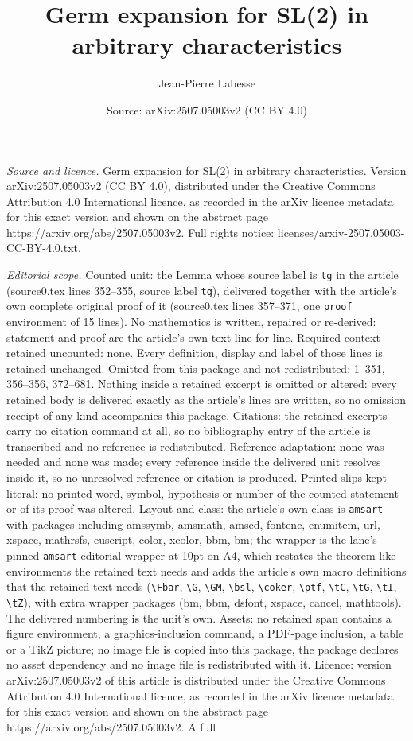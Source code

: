 \documentclass[10pt,a4paper]{amsart}
\title[Germ expansion for SL(2) in arbitrary characteristics]{Germ expansion for SL(2) in arbitrary characteristics}
\author{Jean-Pierre Labesse}
\date{Source: arXiv:2507.05003v2 (CC BY 4.0)}
\begin{document}
\maketitle

\noindent\emph{Source and licence.} Germ expansion for SL(2) in arbitrary characteristics. Version arXiv:2507.05003v2 (CC BY 4.0), distributed under the Creative Commons Attribution 4.0 International licence, as recorded in the arXiv licence metadata for this exact version and shown on the abstract page https://arxiv.org/abs/2507.05003v2. Full rights notice: licenses/arxiv-2507.05003-CC-BY-4.0.txt.\par\smallskip

\noindent\textit{Editorial scope.} Counted unit: the Lemma whose source label is \texttt{tg} in the article (source0.tex lines 352--355, source label \texttt{tg}), delivered together with the article's own complete original proof of it (source0.tex lines 357--371, one \texttt{proof} environment of 15 lines). No mathematics is written, repaired or re-derived: statement and proof are the article's own text line for line. Required context retained uncounted: none. Every definition, display and label of those lines is retained unchanged. Omitted from this package and not redistributed: 1--351, 356--356, 372--681. Nothing inside a retained excerpt is omitted or altered: every retained body is delivered exactly as the article's lines are written, so no omission receipt of any kind accompanies this package. Citations: the retained excerpts carry no citation command at all, so no bibliography entry of the article is transcribed and no reference is redistributed. Reference adaptation: none was needed and none was made; every reference inside the delivered unit resolves inside it, so no unresolved reference or citation is produced. Printed slips kept literal: no printed word, symbol, hypothesis or number of the counted statement or of its proof was altered. Layout and class: the article's own class is \texttt{amsart} with packages including amssymb, amsmath, amscd, fontenc, enumitem, url, xspace, mathrsfs, euscript, color, xcolor, bbm, bm; the wrapper is the lane's pinned \texttt{amsart} editorial wrapper at 10pt on A4, which restates the theorem-like environments the retained text needs and adds the article's own macro definitions that the retained text needs (\texttt{\textbackslash Fbar}, \texttt{\textbackslash G}, \texttt{\textbackslash GM}, \texttt{\textbackslash bsl}, \texttt{\textbackslash coker}, \texttt{\textbackslash ptf}, \texttt{\textbackslash tC}, \texttt{\textbackslash tG}, \texttt{\textbackslash tI}, \texttt{\textbackslash tZ}), with extra wrapper packages (bm, bbm, dsfont, xspace, cancel, mathtools). The delivered numbering is the unit's own. Assets: no retained span contains a figure environment, a graphics-inclusion command, a PDF-page inclusion, a table or a TikZ picture; no image file is copied into this package, the package declares no asset dependency and no image file is redistributed with it. Licence: version arXiv:2507.05003v2 of this article is distributed under the Creative Commons Attribution 4.0 International licence, as recorded in the arXiv licence metadata for this exact version and shown on the abstract page https://arxiv.org/abs/2507.05003v2. A full 
\end{document}

